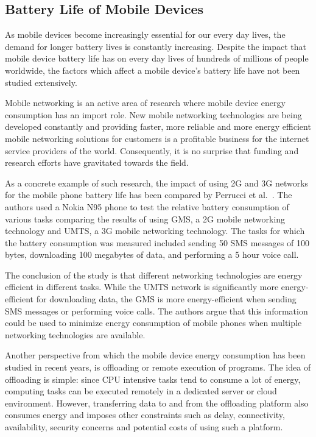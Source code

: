 \subsection{Battery Life of Mobile Devices}

As mobile devices become increasingly essential for our every day lives, the demand for longer battery lives is constantly increasing. Despite the impact that mobile device battery life has on every day lives of hundreds of millions of people worldwide, the factors which affect a mobile device's battery life have not been studied extensively.

Mobile networking is an active area of research where mobile device energy consumption has an import role. New mobile networking technologies are being developed constantly and providing faster, more reliable and more energy efficient mobile networking solutions for customers is a profitable business for the internet service providers of the world. Consequently, it is no surprise that funding and research efforts have gravitated towards the field.  

As a concrete example of such research, the impact of using 2G and 3G networks for the mobile phone battery life has been compared by Perrucci et al.~\cite{5357972}. The authors used a Nokia N95 phone to test the relative battery consumption of various tasks comparing the results of using GMS, a 2G mobile networking technology and UMTS, a 3G mobile networking technology. The tasks for which the battery consumption was measured included sending 50 SMS messages of 100 bytes, downloading 100 megabytes of data, and performing a 5 hour voice call.

The conclusion of the study is that different networking technologies are energy efficient in different tasks. While the UMTS network is significantly more energy-efficient for downloading data, the GMS is more energy-efficient when sending SMS messages or performing voice calls. The authors argue that this information could be used to minimize energy consumption of mobile phones when multiple networking technologies are available.       

Another perspective from which the mobile device energy consumption has been studied in recent years, is offloading or remote execution of programs. The idea of offloading is simple: since CPU intensive tasks tend to consume a lot of energy, computing tasks can be executed remotely in a dedicated server or cloud environment. However, transferring data to and from the offloading platform also consumes energy and imposes other constraints such as delay, connectivity, availability, security concerns and potential costs of using such a platform.


